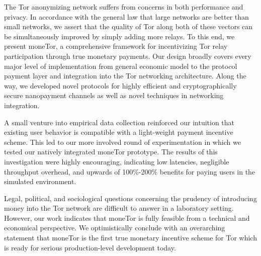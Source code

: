 The Tor anonymizing network suffers from concerns in both performance and
privacy. In accordance with the general law that large networks are better than
small networks, we assert that the quality of Tor along both of these vectors
can be simultaneously improved by simply adding more relays. To this end, we
present moneTor, a comprehensive framework for incentivizing Tor relay
participation through true monetary payments. Our design broadly covers every
major level of implementation from general economic model to the protocol
payment layer and integration into the Tor networking architecture. Along the
way, we developed novel protocols for highly efficient and cryptographically
secure nanopayment channels as well as novel techniques in networking
integration.

A small venture into empirical data collection reinforced our intuition that
existing user behavior is compatible with a light-weight payment incentive
scheme. This led to our more involved round of experimentation in which we
tested our natively integrated moneTor prototype. The results of this
investigation were highly encouraging, indicating low latencies, negligible
throughput overhead, and upwards of 100\%-200\% benefits for paying users in the
simulated environment.

Legal, political, and sociological questions concerning the prudency of
introducing money into the Tor network are difficult to answer in a laboratory
setting. However, our work indicates that moneTor is fully feasible from a
technical and economical perspective. We optimistically conclude with an
overarching statement that moneTor is the first true monetary incentive scheme for
Tor which is ready for serious production-level development today.
